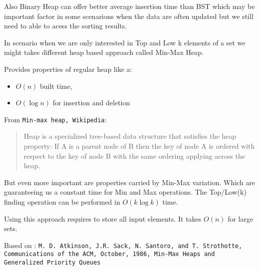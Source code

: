 Also Binary Heap can offer better average insertion time than BST which may
be important factor in some scenarions when the data are often updated but we 
still need to able to acess the sorting results.

In scenario when we are only interested in Top and Low k elements of a set we might takes
different heap based approach called Min-Max Heap.

Provides properties of regular heap like a: 
\begin{itemize}
\item $O(n)$ built time,
\item $O(\log{}n)$ for insertion and deletion
\end{itemize}

From \texttt{Min-max heap, Wikipedia}:
\begin{quote}Heap is a specialized tree-based data structure that satisfies the heap property: 
If A is a parent node of B then the key of node A is ordered with respect to the key of node 
B with the same ordering applying across the heap.
\end{quote}

But even more important are properties carried by Min-Max variation. Which are 
guaranteeing us a constant time for Min and Max operations. The Top/Low(k) 
finding operation can be performed in $O(k\log{}k)$ time.

Using this approach requires to store all input elements. It takes $O(n)$ for 
large sets.

Based on : \texttt{M. D. Atkinson, J.R. Sack, N. Santoro, and T. Strothotte, 
Communications of the ACM, 
October, 1986, 
Min-Max Heaps and Generalized Priority Queues}
